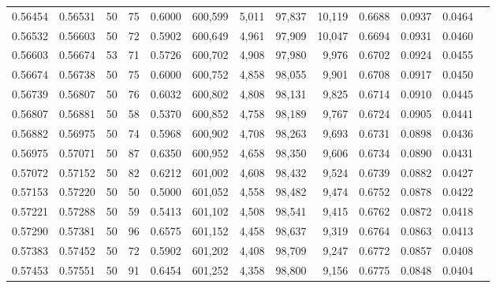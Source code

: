 \begin{tabular}{rrrrrrrrrrrrr}
0.56454 & 0.56531 &    50 &  75 &                                     0.6000 & 600,599 &   5,011 &  97,837 &  10,119 & 0.6688 & 0.0937 & 0.0464 \\
0.56532 & 0.56603 &    50 &  72 &                                     0.5902 & 600,649 &   4,961 &  97,909 &  10,047 & 0.6694 & 0.0931 & 0.0460 \\
0.56603 & 0.56674 &    53 &  71 &                                     0.5726 & 600,702 &   4,908 &  97,980 &   9,976 & 0.6702 & 0.0924 & 0.0455 \\
0.56674 & 0.56738 &    50 &  75 &                                     0.6000 & 600,752 &   4,858 &  98,055 &   9,901 & 0.6708 & 0.0917 & 0.0450 \\
0.56739 & 0.56807 &    50 &  76 &                                     0.6032 & 600,802 &   4,808 &  98,131 &   9,825 & 0.6714 & 0.0910 & 0.0445 \\
0.56807 & 0.56881 &    50 &  58 &                                     0.5370 & 600,852 &   4,758 &  98,189 &   9,767 & 0.6724 & 0.0905 & 0.0441 \\
0.56882 & 0.56975 &    50 &  74 &                                     0.5968 & 600,902 &   4,708 &  98,263 &   9,693 & 0.6731 & 0.0898 & 0.0436 \\
0.56975 & 0.57071 &    50 &  87 &                                     0.6350 & 600,952 &   4,658 &  98,350 &   9,606 & 0.6734 & 0.0890 & 0.0431 \\
0.57072 & 0.57152 &    50 &  82 &                                     0.6212 & 601,002 &   4,608 &  98,432 &   9,524 & 0.6739 & 0.0882 & 0.0427 \\
0.57153 & 0.57220 &    50 &  50 &                                     0.5000 & 601,052 &   4,558 &  98,482 &   9,474 & 0.6752 & 0.0878 & 0.0422 \\
0.57221 & 0.57288 &    50 &  59 &                                     0.5413 & 601,102 &   4,508 &  98,541 &   9,415 & 0.6762 & 0.0872 & 0.0418 \\
0.57290 & 0.57381 &    50 &  96 &                                     0.6575 & 601,152 &   4,458 &  98,637 &   9,319 & 0.6764 & 0.0863 & 0.0413 \\
0.57383 & 0.57452 &    50 &  72 &                                     0.5902 & 601,202 &   4,408 &  98,709 &   9,247 & 0.6772 & 0.0857 & 0.0408 \\
0.57453 & 0.57551 &    50 &  91 &                                     0.6454 & 601,252 &   4,358 &  98,800 &   9,156 & 0.6775 & 0.0848 & 0.0404 \\

\end{tabular}
